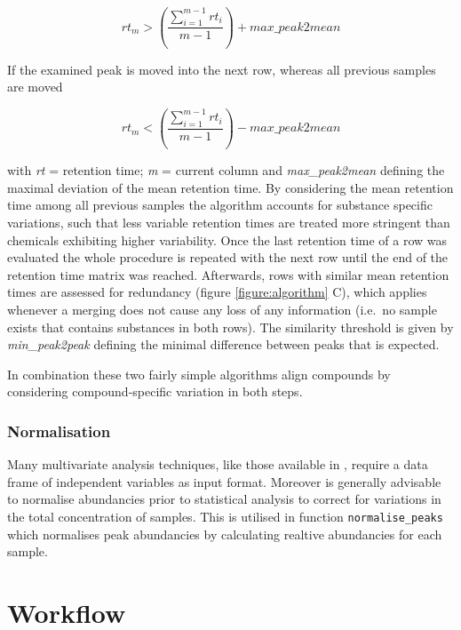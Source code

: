 \begin{equation}
rt_{m} > \left(\frac{\sum_{i=1}^{m-1}rt_{i}}{m-1}\right) + max{\_}peak2mean
\end{equation}

If the examined peak is moved into the next row, whereas all previous
samples are moved \par

\begin{equation}
rt_{m} < \left(\frac{\sum_{i=1}^{m-1}rt_{i}}{m-1}\right) - max{\_}peak2mean
\end{equation}

with \textit{rt} = retention time; \textit{m} = current column and
\textit{max{\_}peak2mean} defining the maximal deviation of the mean
retention time. \newline By considering the mean retention time among
all previous samples the algorithm accounts for substance specific
variations, such that less variable retention times are treated more
stringent than chemicals exhibiting higher variability. Once the last
retention time of a row was evaluated the whole procedure is repeated
with the next row until the end of the retention time matrix was
reached. Afterwards, rows with similar mean retention times are assessed
for redundancy (figure \ref{figure:algorithm} C), which applies whenever
a merging does not cause any loss of any information (i.e.~no sample
exists that contains substances in both rows). The similarity threshold
is given by \textit{min{\_}peak2peak} defining the minimal difference
between peaks that is expected. \par In combination these two fairly
simple algorithms align compounds by considering compound-specific
variation in both steps.

\subsubsection{Normalisation}

Many multivariate analysis techniques, like those available in
, require a data frame of independent variables as input
format. Moreover is generally advisable to normalise abundancies prior
to statistical analysis to correct for variations in the total
concentration of samples. This is utilised in  function
\texttt{normalise\_peaks} which normalises peak abundancies by
calculating realtive abundancies for each sample.

\section{Workflow}

